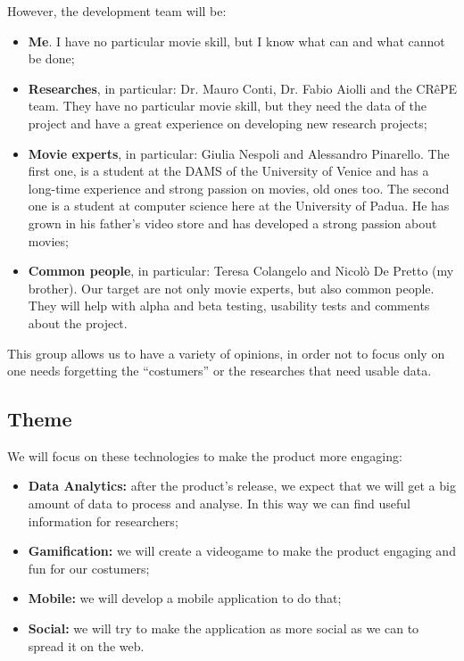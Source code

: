 However, the development team will be:
\begin{itemize}
\item \textbf{Me}. I have no particular movie skill, but I know what can and what cannot be done;
\item \textbf{Researches}, in particular: Dr. Mauro Conti, Dr. Fabio Aiolli and the CRêPE team. They have no particular movie skill, but they need the data of the project and have a great experience on developing new research projects;
\item \textbf{Movie experts}, in particular: Giulia Nespoli and Alessandro Pinarello. The first one, is a student at the DAMS of the University of Venice and has a long-time experience and strong passion on movies, old ones too. The second one is a student at computer science here at the University of Padua. He has grown in his father's video store and has developed a strong passion about movies;
\item \textbf{Common people}, in particular: Teresa Colangelo and Nicolò De Pretto (my brother). Our target are not only movie experts, but also common people. They will help with alpha and beta testing, usability tests and comments about the project.
\end{itemize}

This group allows us to have a variety of opinions, in order not to focus only on one needs forgetting the ``costumers'' or the researches that need usable data.

\subsection{Theme}

We will focus on these technologies to make the product more engaging:
\begin{itemize}
\item \textbf{Data Analytics:} after the product's release, we expect that we will get a big amount of data to process and analyse. In this way we can find useful information for researchers;
\item \textbf{Gamification:} we will create a videogame to make the product engaging and fun for our costumers;
\item \textbf{Mobile:} we will develop a mobile application to do that;
\item \textbf{Social:} we will try to make the application as more social as we can to spread it on the web.
\end{itemize}

